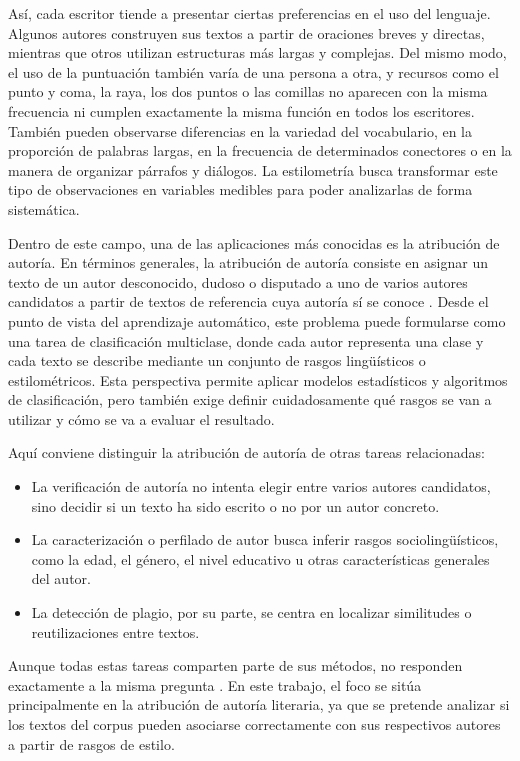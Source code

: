 \documentclass[IB]{TFUOC}%
\begin{document}
Así, cada escritor tiende a presentar ciertas preferencias en el uso del lenguaje. Algunos autores construyen sus textos a partir de oraciones breves y directas, mientras que otros utilizan estructuras más largas y complejas. Del mismo modo, el uso de la puntuación también varía de una persona a otra, y recursos como el punto y coma, la raya, los dos puntos o las comillas no aparecen con la misma frecuencia ni cumplen exactamente la misma función en todos los escritores. También pueden observarse diferencias en la variedad del vocabulario, en la proporción de palabras largas, en la frecuencia de determinados conectores o en la manera de organizar párrafos y diálogos. La estilometría busca transformar este tipo de observaciones en variables medibles para poder analizarlas de forma sistemática.

Dentro de este campo, una de las aplicaciones más conocidas es la atribución de autoría. En términos generales, la atribución de autoría consiste en asignar un texto de un autor desconocido, dudoso o disputado a uno de varios autores candidatos a partir de textos de referencia cuya autoría sí se conoce \cite{stamatatos2009survey}. Desde el punto de vista del aprendizaje automático, este problema puede formularse como una tarea de clasificación multiclase, donde cada autor representa una clase y cada texto se describe mediante un conjunto de rasgos lingüísticos o estilométricos. Esta perspectiva permite aplicar modelos estadísticos y algoritmos de clasificación, pero también exige definir cuidadosamente qué rasgos se van a utilizar y cómo se va a evaluar el resultado.

Aquí conviene distinguir la atribución de autoría de otras tareas relacionadas:

\begin{itemize}
	\item La verificación de autoría no intenta elegir entre varios autores candidatos, sino decidir si un texto ha sido escrito o no por un autor concreto.
	\item La caracterización o perfilado de autor busca inferir rasgos sociolingüísticos, como la edad, el género, el nivel educativo u otras características generales del autor.
	\item La detección de plagio, por su parte, se centra en localizar similitudes o reutilizaciones entre textos.
\end{itemize}

Aunque todas estas tareas comparten parte de sus métodos, no responden exactamente a la misma pregunta \cite{he2024authorship}. En este trabajo, el foco se sitúa principalmente en la atribución de autoría literaria, ya que se pretende analizar si los textos del corpus pueden asociarse correctamente con sus respectivos autores a partir de rasgos de estilo.
\end{document}
